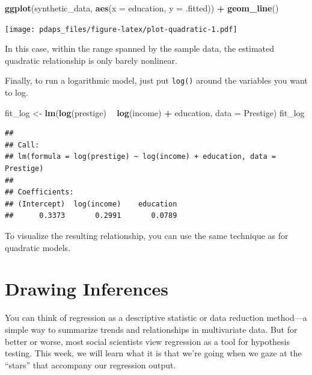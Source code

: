 \documentclass[12pt,oneside,openany]{book}
\newenvironment{Shaded}{\begin{snugshade}}{\end{snugshade}}
\newcommand{\KeywordTok}[1]{\textcolor[rgb]{0.13,0.29,0.53}{\textbf{#1}}}
\newcommand{\DataTypeTok}[1]{\textcolor[rgb]{0.13,0.29,0.53}{#1}}
\newcommand{\StringTok}[1]{\textcolor[rgb]{0.31,0.60,0.02}{#1}}
\newcommand{\OperatorTok}[1]{\textcolor[rgb]{0.81,0.36,0.00}{\textbf{#1}}}
\newcommand{\NormalTok}[1]{#1}
\begin{document}
\begin{Shaded}
\begin{Highlighting}[]
\KeywordTok{ggplot}\NormalTok{(synthetic_data, }\KeywordTok{aes}\NormalTok{(}\DataTypeTok{x =}\NormalTok{ education, }\DataTypeTok{y =}\NormalTok{ .fitted)) }\OperatorTok{+}
\StringTok{    }\KeywordTok{geom_line}\NormalTok{()}
\end{Highlighting}
\end{Shaded}

\texttt{[image: pdaps\_files/figure-latex/plot-quadratic-1.pdf]}

In this case, within the range spanned by the sample data, the estimated
quadratic relationship is only barely nonlinear.

Finally, to run a logarithmic model, just put \texttt{log()} around the
variables you want to log.

\begin{Shaded}
\begin{Highlighting}[]
\NormalTok{fit_log <-}\StringTok{ }\KeywordTok{lm}\NormalTok{(}\KeywordTok{log}\NormalTok{(prestige) }\OperatorTok{~}\StringTok{ }\KeywordTok{log}\NormalTok{(income) }\OperatorTok{+}\StringTok{ }\NormalTok{education, }\DataTypeTok{data =}\NormalTok{ Prestige)}
\NormalTok{fit_log}
\end{Highlighting}
\end{Shaded}

\begin{verbatim}
## 
## Call:
## lm(formula = log(prestige) ~ log(income) + education, data = Prestige)
## 
## Coefficients:
## (Intercept)  log(income)    education  
##      0.3373       0.2991       0.0789
\end{verbatim}

To visualize the resulting relationship, you can use the same technique
as for quadratic models.

\chapter{Drawing Inferences}\label{inference}

\providecommand{\Cov}{}
\renewcommand{\Cov}{\mathop{\rm Cov}\nolimits}
\providecommand{\SE}{}
\renewcommand{\SE}{\mathop{\rm SE}\nolimits}
\providecommand{\CI}{}
\renewcommand{\CI}{\mathop{\rm CI}\nolimits}

You can think of regression as a descriptive statistic or data reduction
method---a simple way to summarize trends and relationships in
multivariate data. But for better or worse, most social scientists view
regression as a tool for hypothesis testing. This week, we will learn
what it is that we're going when we gaze at the ``stars'' that accompany
our regression output.
\end{document}
